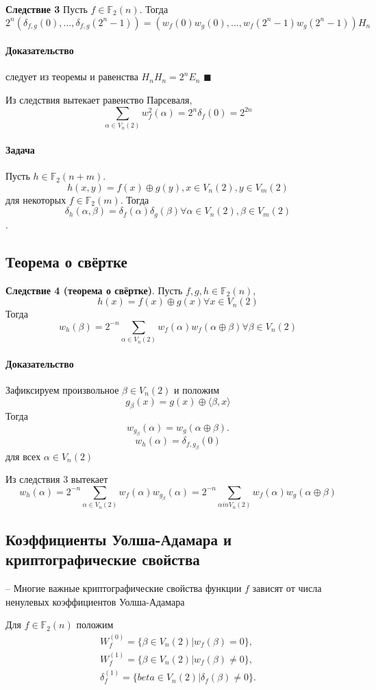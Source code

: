 \documentclass[a4paper,12pt]{article}
\newcommand{\proof}{\paragraph{Доказательство}}
\begin{document}
        \textbf{Следствие 3} Пусть $f \in \mathbb{F}_2(n)$. Тогда \[
          2^n(\delta_{f, g}(0), ..., \delta_{f, g}(2^n - 1)) =
          (w_f(0)w_g(0), ..., w_f(2^n - 1)w_g(2^n - 1)) H_n \]
        \proof следует из теоремы и равенства $H_n H_n = 2^n E_n$
        $\blacksquare$

        Из следствия вытекает равенство Парсеваля, \[ \sum_{\alpha \in
            V_n(2)} w_f^2(\alpha) = 2^n \delta_f(0) = 2^{2n} \]

        \paragraph{Задача}
        Пусть $h \in \mathbb{F}_2(n+m)$. \[ h(x, y) = f(x) \oplus g(y),
          x \in V_n(2), y \in V_m(2) \] для некоторых $f \in
        \mathbb{F}_2(m)$. Тогда \[ \delta_h(\alpha, \beta) =
          \delta_f(\alpha)\delta_g(\beta) \forall \alpha \in V_n(2),
          \beta \in V_m(2) \].

        \subsection{Теорема о свёртке}
        \textbf{Следствие 4 (теорема о свёртке)}. Пусть $f,g,h \in
        \mathbb{F}_2(n)$, \[ h(x) = f(x) \oplus g(x) \forall x \in
          V_n(2) \]
        Тогда \[ w_h(\beta) = 2^{-n} \sum_{\alpha \in V_n(2)}
          w_f(\alpha) w_f(\alpha \oplus \beta) \forall \beta \in
          V_n(2)\]
        \proof Зафиксируем произвольное $\beta \in V_n(2)$ и положим \[
          g_{\beta}(x) = g(x) \oplus \langle \beta, x \rangle \]
        Тогда \[w_{g_{\beta}}(\alpha) = w_g(\alpha \oplus
          \beta). \] \[w_h(\alpha) = \delta_{f, g_{\beta}}(0) \]
        для всех $\alpha \in V_n(2)$

        Из следствия 3 вытекает \[ w_h(\alpha) = 2^{-n} \sum_{\alpha
            \in V_n(2)} w_f(\alpha)w_{g_{\beta}}(\alpha) = 2^{-n}
          \sum_{\alpha in V_n(2)} w_f(\alpha) w_g(\alpha \oplus
          \beta) \]

        \subsection{Коэффициенты Уолша-Адамара и криптографические
          свойства}
        -- Многие важные криптографические свойства функции $f$
        зависят от числа ненулевых коэффициентов Уолша-Адамара

        Для $f \in \mathbb{F}_2(n)$ положим
        \[
          \begin{aligned}
            W_f^{(0)} = \{ \beta \in V_n(2) | w_f(\beta) = 0 \},\\
            W_f^{(1)} = \{ \beta \in V_n(2) | w_f(\beta) \ne 0 \},\\
            \delta_f^{(1)} = \{ beta \in V_n(2) | \delta_f(\beta) \ne
            0 \}.
          \end{aligned}
        \]
\end{document}
